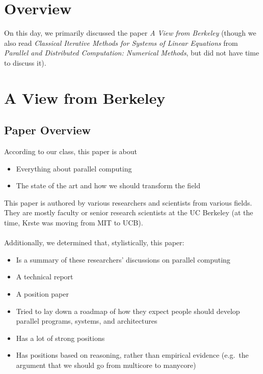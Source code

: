 



\section{Overview}\label{feb-11:overview}
On this day, we primarily discussed the paper \textit{A View from Berkeley}\cite{Asanovic:EECS-2006-183} (though we also read \textit{Classical Iterative Methods for Systems of Linear Equations} from \textit{Parallel and Distributed Computation: Numerical Methods}\cite{Bertsekas:1989:PDC:59912}, but did not have time to discuss it).

\section{A View from Berkeley}\label{feb-11:a-view}
\subsection{Paper Overview}\label{feb-11:a-view:overview}
According to our class, this paper is about
\begin{itemize}
    \item Everything about parallel computing
    \item The state of the art and how we should transform the field
\end{itemize}
This paper is authored by various researchers and scientists from various fields.
They are mostly faculty or senior research scientists at the UC Berkeley (at the time, Krste was moving from MIT to UCB).
\\ \\
Additionally, we determined that, stylistically, this paper:
\begin{itemize}
    \item Is a summary of these researchers' discussions on parallel computing
    \item A technical report
    \item A position paper
    \item Tried to lay down a roadmap of how they expect people should develop parallel programs, systems, and architectures
    \item Has a lot of strong positions
    \item Has positions based on reasoning, rather than empirical evidence (e.g.\ the argument that we should go from multicore to manycore)
\end{itemize}

